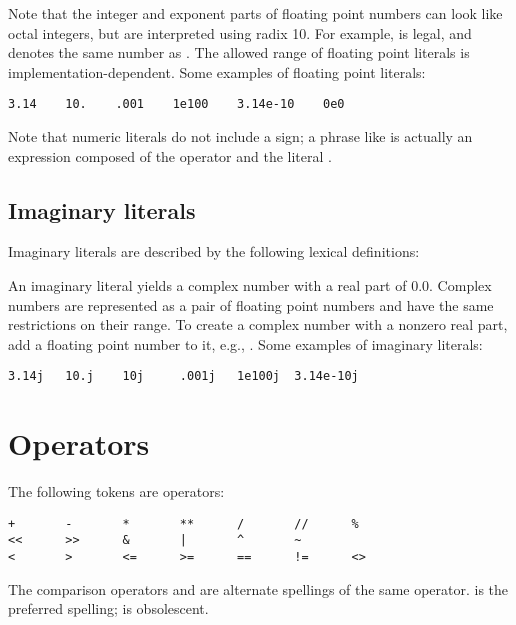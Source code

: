 Note that the integer and exponent parts of floating point numbers
can look like octal integers, but are interpreted using radix 10.  For
example,  is legal, and denotes the same number
as .
The allowed range of floating point literals is
implementation-dependent.
Some examples of floating point literals:

\begin{verbatim}
3.14    10.    .001    1e100    3.14e-10    0e0
\end{verbatim}

Note that numeric literals do not include a sign; a phrase like
 is actually an expression composed of the operator
\code{-} and the literal .


\subsection{Imaginary literals\label{imaginary}}

Imaginary literals are described by the following lexical definitions:

\begin{productionlist}
\end{productionlist}

An imaginary literal yields a complex number with a real part of
0.0.  Complex numbers are represented as a pair of floating point
numbers and have the same restrictions on their range.  To create a
complex number with a nonzero real part, add a floating point number
to it, e.g., .  Some examples of imaginary literals:

\begin{verbatim}
3.14j   10.j    10j     .001j   1e100j  3.14e-10j 
\end{verbatim}


\section{Operators\label{operators}}

The following tokens are operators:

\begin{verbatim}
+       -       *       **      /       //      %
<<      >>      &       |       ^       ~
<       >       <=      >=      ==      !=      <>
\end{verbatim}

The comparison operators \code{<>} and \code{!=} are alternate
spellings of the same operator.  \code{!=} is the preferred spelling;
\code{<>} is obsolescent.


